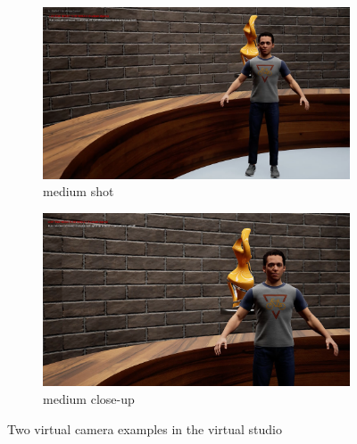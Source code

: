 \documentclass[
  a4paper,  %
  twoside,  %
  bibliography=totoc,
  headsepline,
  cleardoublepage=empty,
  parskip=half,
  draft=false
]{scrbook}
\begin{document}
\begin{figure}[h]
  \centering
  \begin{subfigure}{0.45\textwidth}
    \includegraphics[width=\linewidth]{graphics/unreal-engine/camera angles/medium closeup.png}
    \caption{medium shot}
  \end{subfigure}
  \begin{subfigure}{0.45\textwidth}
    \includegraphics[width=\linewidth]{graphics/unreal-engine/camera angles/close up.png}
    \caption{medium close-up}
  \end{subfigure}
  \caption{Two virtual camera examples in the virtual studio}
  \label{fig:cameras}
\end{figure}
\end{document}
